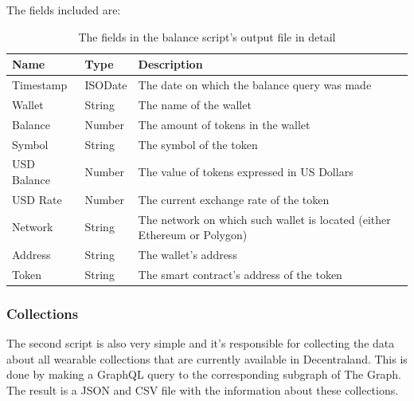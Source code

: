 \documentclass[MSE,Master,english]{twbook}%
\begin{document}
The fields included are:
\begin{table}[H]
  \centering
  \begin{tabularx}{\textwidth}{|l|l|X|}
  \hline
  \textbf{Name} & \textbf{Type} & \textbf{Description}                         \\ \hline
  Timestamp     & ISODate       & The date on which the balance query was made \\ \hline
  Wallet        & String        & The name of the wallet                       \\ \hline
  Balance       & Number        & The amount of tokens in the wallet           \\ \hline
  Symbol        & String        & The symbol of the token                      \\ \hline
  USD Balance   & Number        & The value of tokens expressed in US Dollars  \\ \hline
  USD Rate      & Number        & The current exchange rate of the token       \\ \hline
  Network & String & The network on which such wallet is located (either Ethereum or Polygon) \\ \hline
  Address       & String        & The wallet's address                         \\ \hline
  Token         & String        & The smart contract's address of the token    \\ \hline
  \end{tabularx}
  \caption{The fields in the balance script's output file in detail}
  \label{table:balace}
\end{table}

\subsubsection{Collections}
The second script is also very simple and it's responsible for collecting the data about all wearable collections that are currently available in Decentraland. This is done by making a GraphQL\cite{graphql} query to the corresponding subgraph of The Graph. The result is a JSON and CSV file with the information about these collections. \\
\end{document}
